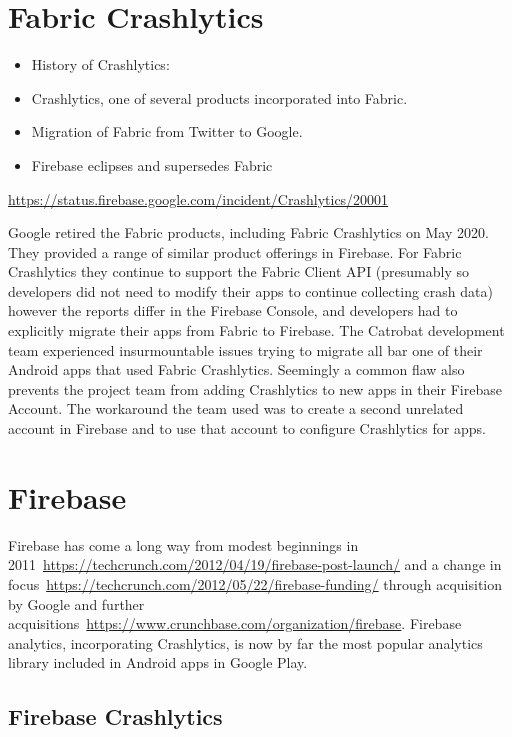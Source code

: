 \section{Fabric Crashlytics}

\begin{itemize}
    \item History of Crashlytics:
    \item Crashlytics, one of several products incorporated into Fabric.
    \item Migration of Fabric from Twitter to Google.
    \item Firebase eclipses and supersedes Fabric
\end{itemize}

\url{https://status.firebase.google.com/incident/Crashlytics/20001}

Google retired the Fabric products, including Fabric Crashlytics on  May 2020. They provided a range of similar product offerings in Firebase. For Fabric Crashlytics they continue to support the Fabric Client API (presumably so developers did not need to modify their apps to continue collecting crash data) however the reports differ in the Firebase Console, and developers had to explicitly migrate their apps from Fabric to Firebase. The Catrobat development team experienced insurmountable issues trying to migrate all bar one of their Android apps that used Fabric Crashlytics. Seemingly a common flaw also prevents the project team from adding Crashlytics to new apps in their Firebase Account. The workaround the team used was to create a second unrelated account in Firebase and to use that account to configure Crashlytics for apps. %

\section{Firebase}
Firebase has come a long way from modest beginnings in 2011~\url{https://techcrunch.com/2012/04/19/firebase-post-launch/} and a change in focus~\url{https://techcrunch.com/2012/05/22/firebase-funding/} through acquisition by Google and further acquisitions~\url{https://www.crunchbase.com/organization/firebase}. Firebase analytics, incorporating Crashlytics, is now by far the most popular analytics library included in Android apps in Google Play. 

\subsection{Firebase Crashlytics}

